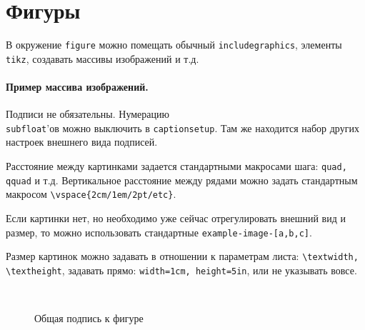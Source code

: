 
\section{Фигуры}
В окружение \texttt{figure} можно помещать обычный \texttt{includegraphics}, элементы \texttt{tikz}, создавать массивы изображений и т.д.

\paragraph{Пример массива изображений.}
Подписи не обязательны. Нумерацию \\ \texttt{subfloat}'ов можно выключить в \texttt{captionsetup}. Там же находится набор других настроек внешнего вида подписей.

Расстояние между картинками задается стандартными макросами шага: \texttt{quad, qquad} и т.д.
Вертикальное расстояние между рядами можно задать стандартным макросом \verb+\vspace{2cm/1em/2pt/etc}+.

Если картинки нет, но необходимо уже сейчас отрегулировать внешний вид и размер, то можно использовать стандартные \texttt{example-image-[a,b,c]}.

Размер картинок можно задавать в отношении к параметрам листа: \verb+\textwidth, \textheight+, задавать прямо: \verb+width=1cm, height=5in+, или не указывать вовсе.

\begin{figure}[H]
    \centering
    \captionsetup[subfigure]{justification=centering}
    \quad
    \\
    \vspace{0.5cm}
    \quad
    \caption{Общая подпись к фигуре}
\end{figure}
